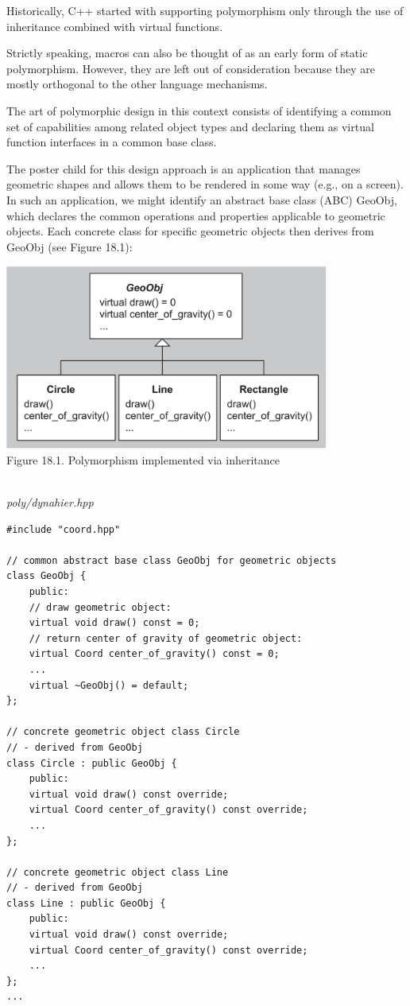 
Historically, C++ started with supporting polymorphism only through the use of inheritance combined with virtual functions.

\begin{tcolorbox}[colback=webgreen!5!white,colframe=webgreen!75!black]
\hspace*{0.75cm}Strictly speaking, macros can also be thought of as an early form of static polymorphism. However, they are left out of consideration because they are mostly orthogonal to the other language mechanisms.
\end{tcolorbox}

The art of polymorphic design in this context consists of identifying a common set of capabilities among related object types and declaring them as virtual function interfaces in a common base class.

The poster child for this design approach is an application that manages geometric shapes and allows them to be rendered in some way (e.g., on a screen). In such an application, we might identify an abstract base class (ABC) GeoObj, which declares the common operations and properties applicable to geometric objects. Each concrete class for specific geometric objects then derives from GeoObj (see Figure 18.1):

\begin{center}
\includegraphics[width=0.8\textwidth]{content/3/chapter18/images/1.png} \\
Figure 18.1. Polymorphism implemented via inheritance
\end{center}

\hspace*{\fill} \\ %
\noindent
\textit{poly/dynahier.hpp}
\begin{lstlisting}[style=styleCXX]
#include "coord.hpp"

// common abstract base class GeoObj for geometric objects
class GeoObj {
	public:
	// draw geometric object:
	virtual void draw() const = 0;
	// return center of gravity of geometric object:
	virtual Coord center_of_gravity() const = 0;
	...
	virtual ~GeoObj() = default;
};

// concrete geometric object class Circle
// - derived from GeoObj
class Circle : public GeoObj {
	public:
	virtual void draw() const override;
	virtual Coord center_of_gravity() const override;
	...
};

// concrete geometric object class Line
// - derived from GeoObj
class Line : public GeoObj {
	public:
	virtual void draw() const override;
	virtual Coord center_of_gravity() const override;
	...
};
...
\end{lstlisting}

